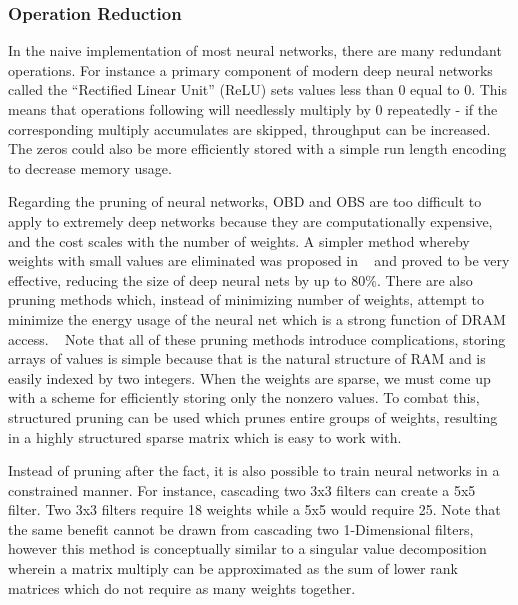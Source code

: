 \subsubsection{Operation Reduction}
In the naive implementation of most neural networks, there are many redundant operations.  For instance a primary component of modern deep neural networks called the ``Rectified Linear Unit'' (ReLU) sets values less than 0 equal to 0.  This means that operations following will needlessly multiply by 0 repeatedly - if the corresponding multiply accumulates are skipped, throughput can be increased.  The zeros could also be more efficiently stored with a simple run length encoding to decrease memory usage. ~\cite{DBLP:journals/corr/SzeCYE17}

Regarding the pruning of neural networks, OBD and OBS are too difficult to apply to extremely deep networks because they are computationally expensive, and the cost scales with the number of weights.  A simpler method whereby weights with small values are eliminated was proposed in ~\cite{DBLP:journals/corr/HanPTD15} and proved to be very effective, reducing the size of deep neural nets by up to $80\%$.  There are also pruning methods which, instead of minimizing number of weights, attempt to minimize the energy usage of the neural net which is a strong function of DRAM access. ~\cite{DBLP:journals/corr/YangCS16a}  Note that all of these pruning methods introduce complications, storing arrays of values is simple because that is the natural structure of RAM and is easily indexed by two integers.  When the weights are sparse, we must come up with a scheme for efficiently storing only the nonzero values.  To combat this, structured pruning can be used which prunes entire groups of weights, resulting in a highly structured sparse matrix which is easy to work with. ~\cite{Yu:2017:SCD:3140659.3080215}

Instead of pruning after the fact, it is also possible to train neural networks in a constrained manner.  For instance, cascading two 3x3 filters can create a 5x5 filter.  Two 3x3 filters require 18 weights while a 5x5 would require 25.  Note that the same benefit cannot be drawn from cascading two 1-Dimensional filters, however this method is conceptually similar to a singular value decomposition wherein a matrix multiply can be approximated as the sum of lower rank matrices which do not require as many weights together.



